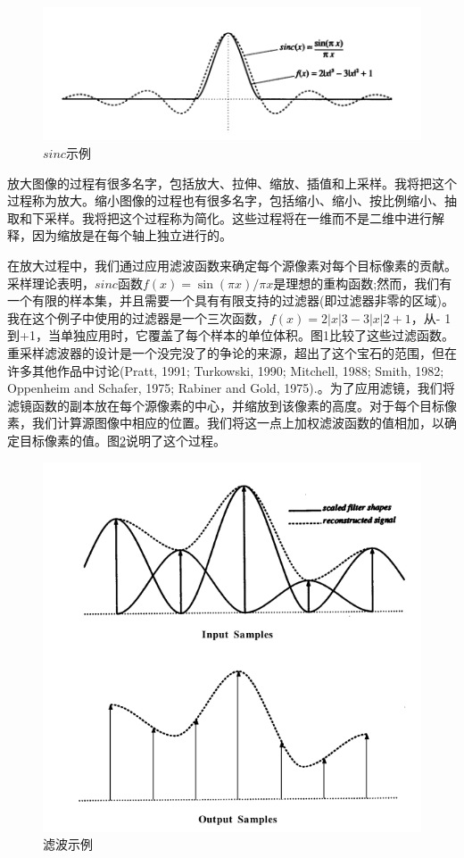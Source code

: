 \begin{CJK}{UTF8}{gbsn}
\begin{figure}[htbp]%
  \centering
  \includegraphics[totalheight=1.7in]{./fig/1.2.1.png}
  \caption{$sinc$示例} 
  \label{fig:sinc}
\end{figure}

放大图像的过程有很多名字，包括放大、拉伸、缩放、插值和上采样。我将把这个过程称为放大。缩小图像的过程也有很多名字，包括缩小、缩小、按比例缩小、抽取和下采样。我将把这个过程称为简化。这些过程将在一维而不是二维中进行解释，因为缩放是在每个轴上独立进行的。

在放大过程中，我们通过应用滤波函数来确定每个源像素对每个目标像素的贡献。采样理论表明，$sinc$函数$f(x) = \sin(πx)/πx$是理想的重构函数;然而，我们有一个有限的样本集，并且需要一个具有有限支持的过滤器(即过滤器非零的区域)。我在这个例子中使用的过滤器是一个三次函数，$f(x) = 2|x| 3 - 3|x| 2 +1$，从- 1到+1，当单独应用时，它覆盖了每个样本的单位体积。图1比较了这些过滤函数。重采样滤波器的设计是一个没完没了的争论的来源，超出了这个宝石的范围，但在许多其他作品中讨论(Pratt, 1991; Turkowski, 1990; Mitchell, 1988; Smith, 1982; Oppenheim and Schafer, 1975; Rabiner and Gold, 1975).。为了应用滤镜，我们将滤镜函数的副本放在每个源像素的中心，并缩放到该像素的高度。对于每个目标像素，我们计算源图像中相应的位置。我们将这一点上加权滤波函数的值相加，以确定目标像素的值。图\ref{fig:sinc2}说明了这个过程。

\begin{figure}[htbp]%
  \centering
  \includegraphics[totalheight=4in]{./fig/1.2.2.png}
  \caption{滤波示例} 
  \label{fig:sinc2}
\end{figure}


\end{CJK}
